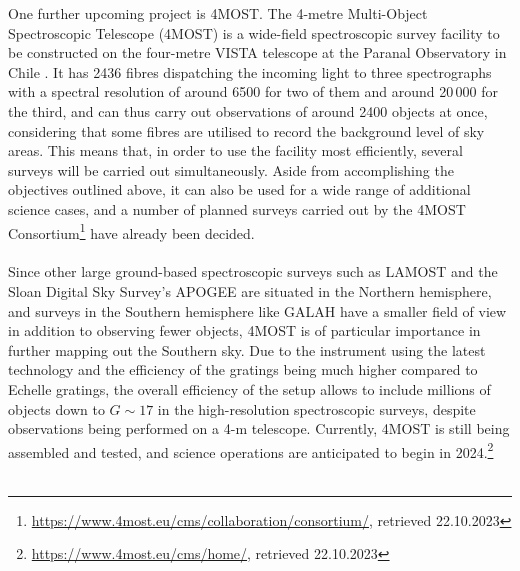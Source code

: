 \documentclass[a4paper,11pt]{article}
\begin{document}
%
One further upcoming project is 4MOST. The 4-metre Multi-Object Spectroscopic Telescope (4MOST) is a wide-field spectroscopic survey facility to be constructed on the four-metre VISTA telescope at the Paranal Observatory in Chile \citep{4mostgen}. It has 2436 fibres dispatching the incoming light to three spectrographs with a spectral resolution of around 6500 for two of them and around 20\,000 for the third, and can thus carry out observations of around 2400 objects at once, considering that some fibres are utilised to record the background level of sky areas. This means that, in order to use the facility most efficiently, several surveys will be carried out simultaneously. Aside from accomplishing the objectives outlined above, it can also be used for a wide range of additional science cases, and a number of planned surveys carried out by the 4MOST Consortium\footnote{\url{https://www.4most.eu/cms/collaboration/consortium/}, retrieved 22.10.2023} have already been decided.\\ \\
%
Since other large ground-based spectroscopic surveys such as LAMOST \citep{lamost3,lamost1,lamost2} and the Sloan Digital Sky Survey's APOGEE \citep{apogee,sdss} are situated in the Northern hemisphere, and surveys in the Southern hemisphere like GALAH \citep{galah} have a smaller field of view in addition to observing fewer objects, 4MOST is of particular importance in further mapping out the Southern sky. Due to the instrument using the latest technology and the efficiency of the gratings being much higher compared to Echelle gratings, the overall efficiency of the setup allows to include millions of objects down to $G\sim17$ in the high-resolution spectroscopic surveys, despite observations being performed on a 4-m telescope. Currently, 4MOST is still being assembled and tested, and science operations are anticipated to begin in 2024.\footnote{\url{https://www.4most.eu/cms/home/}, retrieved 22.10.2023}\\ \\
%
\end{document}
